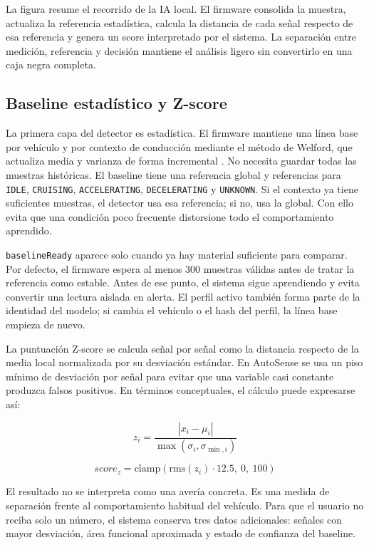 \documentclass[12pt,letterpaper]{report}
\begin{document}
La figura resume el recorrido de la IA local. El firmware consolida la muestra, actualiza la referencia estadística, calcula la distancia de cada señal respecto de esa referencia y genera un score interpretado por el sistema. La separación entre medición, referencia y decisión mantiene el análisis ligero sin convertirlo en una caja negra completa.

\subsection{Baseline estadístico y Z-score}

La primera capa del detector es estadística. El firmware mantiene una línea base por vehículo y por contexto de conducción mediante el método de Welford, que actualiza media y varianza de forma incremental \cite{welford1962_corrected_sums}. No necesita guardar todas las muestras históricas. El baseline tiene una referencia global y referencias para \texttt{IDLE}, \texttt{CRUISING}, \texttt{ACCELERATING}, \texttt{DECELERATING} y \texttt{UNKNOWN}. Si el contexto ya tiene suficientes muestras, el detector usa esa referencia; si no, usa la global. Con ello evita que una condición poco frecuente distorsione todo el comportamiento aprendido.

\texttt{baselineReady} aparece solo cuando ya hay material suficiente para comparar. Por defecto, el firmware espera al menos 300 muestras válidas antes de tratar la referencia como estable. Antes de ese punto, el sistema sigue aprendiendo y evita convertir una lectura aislada en alerta. El perfil activo también forma parte de la identidad del modelo; si cambia el vehículo o el hash del perfil, la línea base empieza de nuevo.

La puntuación Z-score se calcula señal por señal como la distancia respecto de la media local normalizada por su desviación estándar. En AutoSense se usa un piso mínimo de desviación por señal para evitar que una variable casi constante produzca falsos positivos. En términos conceptuales, el cálculo puede expresarse así:

\begin{equation}
z_i = \frac{|x_i - \mu_i|}{\max(\sigma_i,\sigma_{\min,i})}
\end{equation}

\begin{equation}
score_z = \mathrm{clamp}\left(\mathrm{rms}(z_i)\cdot 12.5,\ 0,\ 100\right)
\end{equation}

El resultado no se interpreta como una avería concreta. Es una medida de separación frente al comportamiento habitual del vehículo. Para que el usuario no reciba solo un número, el sistema conserva tres datos adicionales: señales con mayor desviación, área funcional aproximada y estado de confianza del baseline.
\end{document}

